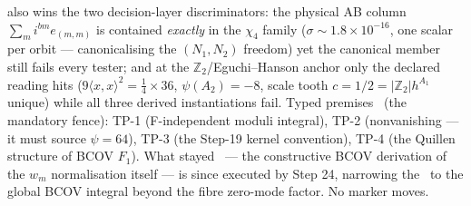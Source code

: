 \documentclass[11pt,a4paper]{article}
\newcommand{\Z}{\mathbb{Z}}
\theoremstyle{definition}
\begin{document}
also wins the two decision-layer discriminators: the physical AB column $\sum_mi^{bm}e_{(m,m)}$
is contained \emph{exactly} in the $\chi_4$ family ($\sigma\sim1.8\times10^{-16}$, one scalar
per orbit --- canonicalising the $(N_1,N_2)$ freedom) yet the canonical member still fails
every tester; and at the $\Z_2$/Eguchi--Hanson anchor only the declared reading hits
($9\langle x,x\rangle^2=\tfrac14\times36$, $\psi(A_2)=-8$, scale tooth $c=1/2=|\Z_2|h^{A_1}$
unique) while all three derived instantiations fail. Typed premises \mC\ (the mandatory fence):
TP-1 (F-independent moduli integral), TP-2 (nonvanishing --- it must source $\psi=64$), TP-3
(the Step-19 kernel convention), TP-4 (the Quillen structure of BCOV $F_1$). What stayed \mO\
--- the constructive BCOV derivation of the $w_m$ normalisation itself --- is since executed
by Step 24, narrowing the \mO\ to the global BCOV integral beyond the fibre zero-mode factor.
No marker moves.
\end{document}
